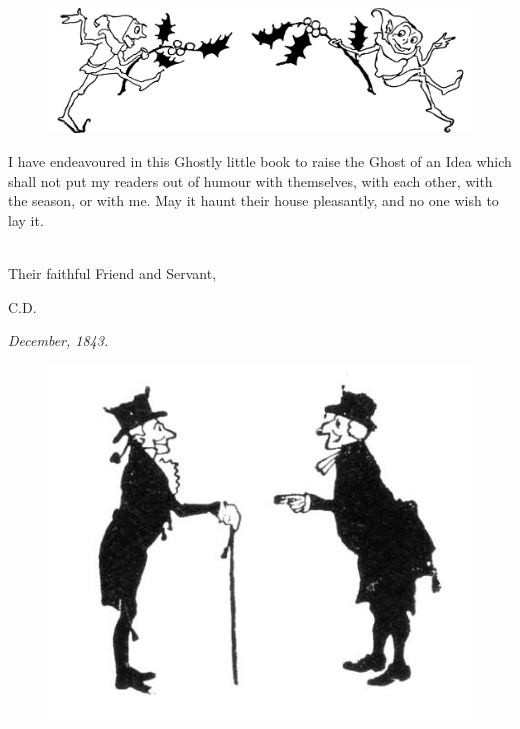 \documentclass[
paper=5.5in:8.5in,
BCOR=7mm,
twoside,
DIV=calc,
fontsize=12pt,
usegeometry,
dottedtocline,
headers=normal,
listof=numbered,
listof=totoc,
listof=flat,
listof=nochaptergap]{scrbook} %
\begin{document}
\clearpage

\renewcommand{\listfigurename}{List of Illustrations}
\listoffigures
\vfill
\begin{figure}[h]
\centering
\includegraphics[width=.9\textwidth]{doublelf}
\caption[Tailpiece to List of Illustrations]{}
\end{figure}
\clearpage


\pagestyle{headings}
\newcommand{\moderatelyhuge}{\fontsize{40}{50}\selectfont}

\lettrine[lines=4]{I}{} have endeavoured in this Ghostly little book to raise the Ghost of an Idea which shall not put my readers out of humour with themselves, with each other, with the season, or with me. May it haunt their house pleasantly, and no one wish to lay it.

~\\

Their faithful Friend and Servant,

\begin{flushright}
\textsc{C.D.}
\end{flushright}

\textit{December, 1843.}
\vfill
\begin{figure}[h]
\centering
\includegraphics[width=.5\textwidth]{gs007}
\caption[Tailpiece to Preface]{}
\end{figure}
\end{document}
